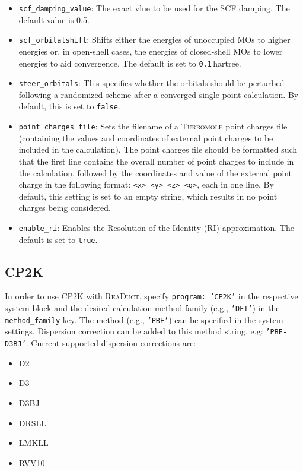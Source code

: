 \documentclass[]{tufte-book}
\begin{document}
\begin{itemize}
\item \texttt{scf\_damping\_value}: The exact vlue to be used for the SCF damping. The default value is 0.5.
\item \texttt{scf\_orbitalshift}: Shifts either the energies of unoccupied MOs to higher energies or, in open-shell cases, the energies of closed-shell MOs to lower energies to aid convergence. The default is set to \texttt{0.1}\,hartree.
\item \texttt{steer\_orbitals}: This specifies whether the orbitals should be perturbed  following a randomized scheme after a converged single point calculation\cite{orbitalperturbation}. By default, this is set to \texttt{false}.
\item \texttt{point\_charges\_file}: Sets the filename of a \textsc{Turbomole} point charges file (containing the values and coordinates of
external point charges to be included in the calculation). The point charges file should be formatted such that the first line contains the overall number of point charges to include in the calculation, followed by the coordinates and value of the external point charge in the following format: \texttt{<x> <y> <z> <q>}, each in one line. By default, this setting is set to an empty string, which results
in no point charges being considered.
\item \texttt{enable\_ri}: Enables the Resolution of the Identity (RI) approximation. The default is set to \texttt{true}. 
\end{itemize}

\subsection{\textsc{CP2K}}

In order to use \textsc{CP2K} with \textsc{ReaDuct}, specify \texttt{program: 'CP2K'} in the respective system block and the desired
calculation method family (e.g., \texttt{'DFT'}) in the \texttt{method\_family} key.
The method (e.g., \texttt{'PBE'}) can be specified in the system settings. Dispersion correction can be added to this method string, e.g: \texttt{'PBE-D3BJ'}. Current supported dispersion corrections are:
\begin{itemize}
 	\item D2
 	\item D3
 	\item D3BJ
 	\item DRSLL
 	\item LMKLL
 	\item RVV10
\end{itemize}
\end{document}
